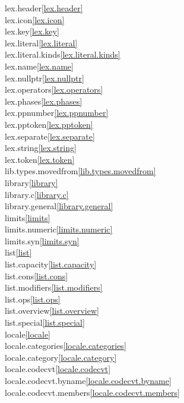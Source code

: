 \begin{multicols}{2}
lex.header\quad\ref{lex.header}\\
lex.icon\quad\ref{lex.icon}\\
lex.key\quad\ref{lex.key}\\
lex.literal\quad\ref{lex.literal}\\
lex.literal.kinds\quad\ref{lex.literal.kinds}\\
lex.name\quad\ref{lex.name}\\
lex.nullptr\quad\ref{lex.nullptr}\\
lex.operators\quad\ref{lex.operators}\\
lex.phases\quad\ref{lex.phases}\\
lex.ppnumber\quad\ref{lex.ppnumber}\\
lex.pptoken\quad\ref{lex.pptoken}\\
lex.separate\quad\ref{lex.separate}\\
lex.string\quad\ref{lex.string}\\
lex.token\quad\ref{lex.token}\\
lib.types.movedfrom\quad\ref{lib.types.movedfrom}\\
library\quad\ref{library}\\
library.c\quad\ref{library.c}\\
library.general\quad\ref{library.general}\\
limits\quad\ref{limits}\\
limits.numeric\quad\ref{limits.numeric}\\
limits.syn\quad\ref{limits.syn}\\
list\quad\ref{list}\\
list.capacity\quad\ref{list.capacity}\\
list.cons\quad\ref{list.cons}\\
list.modifiers\quad\ref{list.modifiers}\\
list.ops\quad\ref{list.ops}\\
list.overview\quad\ref{list.overview}\\
list.special\quad\ref{list.special}\\
locale\quad\ref{locale}\\
locale.categories\quad\ref{locale.categories}\\
locale.category\quad\ref{locale.category}\\
locale.codecvt\quad\ref{locale.codecvt}\\
locale.codecvt.byname\quad\ref{locale.codecvt.byname}\\
locale.codecvt.members\quad\ref{locale.codecvt.members}\\

\end{multicols}
